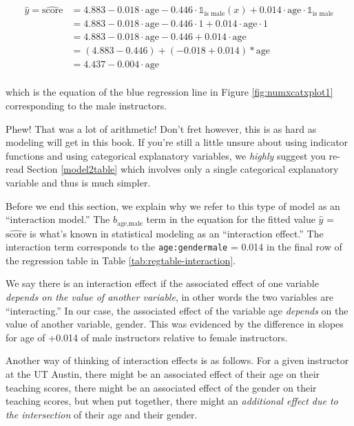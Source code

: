 \documentclass[12pt, krantz2,]{krantz}
\begin{document}
\[
\begin{aligned}
\widehat{y} = \widehat{\text{score}} &= 4.883 - 0.018   \cdot \mbox{age} - 0.446 \cdot \mathbb{1}_{\mbox{is male}}(x) + 0.014 \cdot \mbox{age} \cdot \mathbb{1}_{\mbox{is male}}\\
&= 4.883 - 0.018    \cdot \mbox{age} - 0.446 \cdot 1 + 0.014 \cdot \mbox{age} \cdot 1\\
&= 4.883 - 0.018    \cdot \mbox{age} - 0.446 + 0.014 \cdot \mbox{age}\\
&= (4.883 - 0.446) + (- 0.018 + 0.014) * \mbox{age}\\
&= 4.437 - 0.004    \cdot \mbox{age}\\
\end{aligned}
\]

which is the equation of the blue regression line in Figure \ref{fig:numxcatxplot1} corresponding to the male instructors.

Phew! That was a lot of arithmetic! Don't fret however, this is as hard as modeling will get in this book. If you're still a little unsure about using indicator functions and using categorical explanatory variables, we \emph{highly} suggest you re-read Section \ref{model2table} which involves only a single categorical explanatory variable and thus is much simpler.

Before we end this section, we explain why we refer to this type of model as an ``interaction model.'' The \(b_{\mbox{age,male}}\) term in the equation for the fitted value \(\widehat{y}\) = \(\widehat{\text{score}}\) is what's known in statistical modeling as an ``interaction effect.'' The interaction term corresponds to the \texttt{age:gendermale} = 0.014 in the final row of the regression table in Table \ref{tab:regtable-interaction}.

We say there is an interaction effect if the associated effect of one variable \emph{depends on the value of another variable}, in other words the two variables are ``interacting.'' In our case, the associated effect of the variable age \emph{depends} on the value of another variable, gender. This was evidenced by the difference in slopes for age of +0.014 of male instructors relative to female instructors.

Another way of thinking of interaction effects is as follows. For a given instructor at the UT Austin, there might be an associated effect of their age on their teaching scores, there might be an associated effect of the gender on their teaching scores, but when put together, there might an \emph{additional effect due to the intersection} of their age and their gender.
\end{document}
